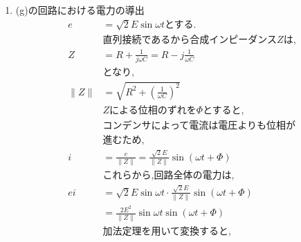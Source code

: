 \documentclass[twocolumn]{article}
\begin{document}
\begin{enumerate}
  \item (g)の回路における電力の導出
        \begin{align*}
          e             & = \sqrt{2}E\sin\omega t \text{とする.}                                                                                     \\
                        & \text{直列接続であるから合成インピーダンス}Z\text{は,}                                                                                     \\
          Z             & = R + \frac{1}{j\omega C} = R -j\frac{1}{\omega C}                                                                      \\
                        & \text{となり,}                                                                                                             \\
          \|Z\|         & = \sqrt{R^2 + {\left( \frac{1}{\omega C} \right)}^2}                                                                    \\
                        & Z\text{による位相のずれを}\Phi\text{とすると,}                                                                                       \\
                        & \text{コンデンサによって電流は電圧よりも位相が}                                                                                             \\
                        & \text{進むため,}                                                                                                            \\
          i             & = \frac{e}{\|Z\|} = \frac{\sqrt{2}E}{\|Z\|}\sin\left(\omega t + \Phi\right)                                             \\
                        & \text{これらから,回路全体の電力は,}                                                                                                  \\
          ei            & = \sqrt{2}E\sin\omega t \cdot \frac{\sqrt{2}E}{\|Z\|}\sin\left(\omega t + \Phi\right)                                   \\
                        & = \frac{2E^2}{\|Z\|}\sin\omega t\sin\left(\omega t + \Phi\right)                                                        \\
                        & \text{加法定理を用いて変換すると,}                                                                                                   \\

\end{align*}
\end{enumerate}
\end{document}
